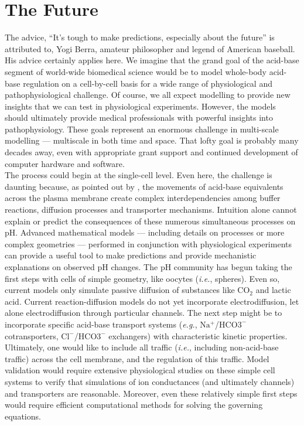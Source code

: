 \documentclass[fleqn,10pt]{physiome}
\begin{document}
\section{The Future}

The advice, ``It's tough to make predictions, especially about the future'' is attributed to, Yogi Berra, amateur philosopher and legend of American baseball. His advice certainly applies here. We imagine that the grand goal of the acid-base segment of world-wide biomedical science would be to model whole-body acid-base regulation on a cell-by-cell basis for a wide range of physiological and pathophysiological challenge. Of course, we all expect modelling to provide new insights that we can test in physiological experiments. However, the models should ultimately provide medical professionals with powerful insights into pathophysiology. These goals represent an enormous challenge in multi-scale modelling --- multiscale in both time and space. That lofty goal is probably many decades away, even with appropriate grant support and continued development of computer hardware and software.\\

The process could begin at the single-cell level. Even here, the challenge is daunting because, as pointed out by \cite{occhipinti2015mathematical}, the movements of acid-base equivalents across the plasma membrane create complex interdependencies among buffer reactions, diffusion processes and transporter mechanisms. Intuition alone cannot explain or predict the consequences of these numerous simultaneous processes on $\mathrm{pH}$. Advanced mathematical models --- including details on processes or more complex geometries --- performed in conjunction with physiological experiments can provide a useful tool to make predictions and provide mechanistic explanations on observed $\mathrm{pH}$ changes. The $\mathrm{pH}$ community has begun taking the first steps with cells of simple geometry, like oocytes (\emph{i.e.}, spheres). Even so, current models only simulate passive diffusion of substances like $\mathrm{CO_2}$ and lactic acid. Current reaction-diffusion models do not yet incorporate electrodiffusion, let alone electrodiffusion through particular channels. The next step might be to incorporate specific acid-base transport systems (\emph{e.g.}, $\mathrm{Na^+}$/$\mathrm{HCO3^-}$ cotransporters,  $\mathrm{Cl^-}$/$\mathrm{HCO3^-}$ exchangers) with characteristic kinetic properties. Ultimately, one would like to include all traffic (\emph{i.e.}, including non-acid-base traffic) across the cell membrane, and the regulation of this traffic. Model validation would require extensive physiological studies on these simple cell systems to verify that simulations of ion conductances (and ultimately channels) and transporters are reasonable. Moreover, even these relatively simple first steps would require efficient computational methods for solving the governing equations.\\
\end{document}
